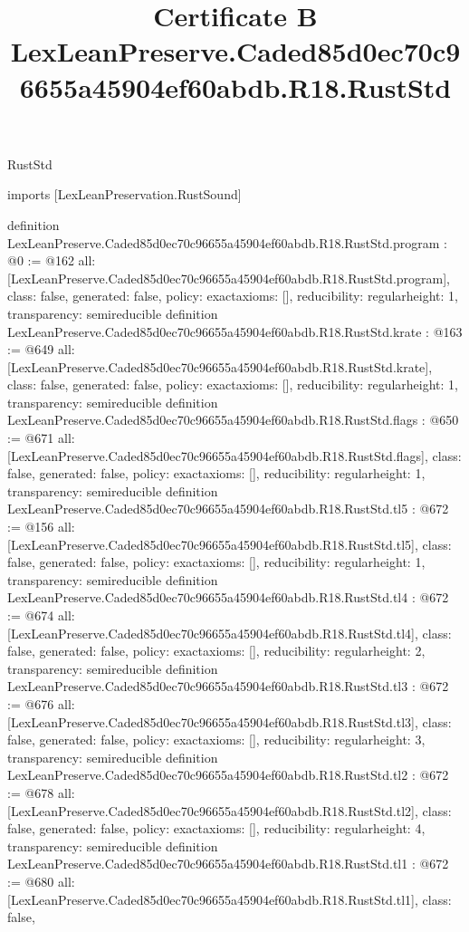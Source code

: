 \begin{lexlean}{RustStd}
\title{Certificate B LexLeanPreserve.Caded85d0ec70c96655a45904ef60abdb.R18.RustStd}
\begin{coremodule}
imports [LexLeanPreservation.RustSound]

definition LexLeanPreserve.Caded85d0ec70c96655a45904ef60abdb.R18.RustStd.program : @0 := @162 {
  all: [LexLeanPreserve.Caded85d0ec70c96655a45904ef60abdb.R18.RustStd.program],
  class: false,
  generated: false,
  policy: exact{axioms: []},
  reducibility: regular{height: 1},
  transparency: semireducible
}
definition LexLeanPreserve.Caded85d0ec70c96655a45904ef60abdb.R18.RustStd.krate : @163 := @649 {
  all: [LexLeanPreserve.Caded85d0ec70c96655a45904ef60abdb.R18.RustStd.krate],
  class: false,
  generated: false,
  policy: exact{axioms: []},
  reducibility: regular{height: 1},
  transparency: semireducible
}
definition LexLeanPreserve.Caded85d0ec70c96655a45904ef60abdb.R18.RustStd.flags : @650 := @671 {
  all: [LexLeanPreserve.Caded85d0ec70c96655a45904ef60abdb.R18.RustStd.flags],
  class: false,
  generated: false,
  policy: exact{axioms: []},
  reducibility: regular{height: 1},
  transparency: semireducible
}
definition LexLeanPreserve.Caded85d0ec70c96655a45904ef60abdb.R18.RustStd.tl5 : @672 := @156 {
  all: [LexLeanPreserve.Caded85d0ec70c96655a45904ef60abdb.R18.RustStd.tl5],
  class: false,
  generated: false,
  policy: exact{axioms: []},
  reducibility: regular{height: 1},
  transparency: semireducible
}
definition LexLeanPreserve.Caded85d0ec70c96655a45904ef60abdb.R18.RustStd.tl4 : @672 := @674 {
  all: [LexLeanPreserve.Caded85d0ec70c96655a45904ef60abdb.R18.RustStd.tl4],
  class: false,
  generated: false,
  policy: exact{axioms: []},
  reducibility: regular{height: 2},
  transparency: semireducible
}
definition LexLeanPreserve.Caded85d0ec70c96655a45904ef60abdb.R18.RustStd.tl3 : @672 := @676 {
  all: [LexLeanPreserve.Caded85d0ec70c96655a45904ef60abdb.R18.RustStd.tl3],
  class: false,
  generated: false,
  policy: exact{axioms: []},
  reducibility: regular{height: 3},
  transparency: semireducible
}
definition LexLeanPreserve.Caded85d0ec70c96655a45904ef60abdb.R18.RustStd.tl2 : @672 := @678 {
  all: [LexLeanPreserve.Caded85d0ec70c96655a45904ef60abdb.R18.RustStd.tl2],
  class: false,
  generated: false,
  policy: exact{axioms: []},
  reducibility: regular{height: 4},
  transparency: semireducible
}
definition LexLeanPreserve.Caded85d0ec70c96655a45904ef60abdb.R18.RustStd.tl1 : @672 := @680 {
  all: [LexLeanPreserve.Caded85d0ec70c96655a45904ef60abdb.R18.RustStd.tl1],
  class: false,
}
\end{coremodule}
\end{lexlean}
